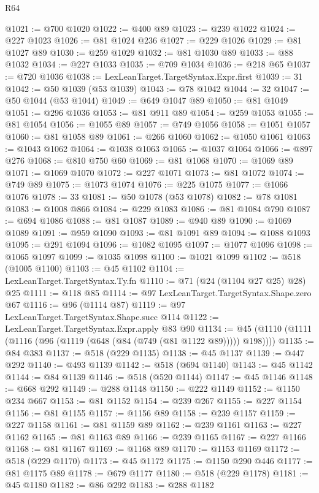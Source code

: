 \begin{lexlean}{R64}
\begin{coremodule}
@1021 := @700 @1020
@1022 := @400 @89
@1023 := @239 @1022
@1024 := @227 @1023
@1026 := @81 @1024 @236
@1027 := @229 @1026
@1029 := @81 @1027 @89
@1030 := @259 @1029
@1032 := @81 @1030 @89
@1033 := @88 @1032
@1034 := @227 @1033
@1035 := @709 @1034
@1036 := @218 @65
@1037 := @720 @1036
@1038 := LexLeanTarget.TargetSyntax.Expr.first
@1039 := 31
@1042 := @50 @1039 (@53 @1039)
@1043 := @78 @1042
@1044 := 32
@1047 := @50 @1044 (@53 @1044)
@1049 := @649 @1047 @89
@1050 := @81 @1049
@1051 := @296 @1036
@1053 := @81 @911 @89
@1054 := @259 @1053
@1055 := @81 @1054
@1056 := @1055 @89
@1057 := @749 @1056
@1058 := @1051 @1057
@1060 := @81 @1058 @89
@1061 := @266 @1060
@1062 := @1050 @1061
@1063 := @1043 @1062
@1064 := @1038 @1063
@1065 := @1037 @1064
@1066 := @897 @276
@1068 := @810 @750 @60
@1069 := @81 @1068
@1070 := @1069 @89
@1071 := @1069 @1070
@1072 := @227 @1071
@1073 := @81 @1072
@1074 := @749 @89
@1075 := @1073 @1074
@1076 := @225 @1075
@1077 := @1066 @1076
@1078 := 33
@1081 := @50 @1078 (@53 @1078)
@1082 := @78 @1081
@1083 := @1008 @866
@1084 := @229 @1083
@1086 := @81 @1084 @790
@1087 := @694 @1086
@1088 := @81 @1087
@1089 := @940 @89
@1090 := @1069 @1089
@1091 := @959 @1090
@1093 := @81 @1091 @89
@1094 := @1088 @1093
@1095 := @291 @1094
@1096 := @1082 @1095
@1097 := @1077 @1096
@1098 := @1065 @1097
@1099 := @1035 @1098
@1100 := @1021 @1099
@1102 := @518 (@1005 @1100)
@1103 := @45 @1102
@1104 := LexLeanTarget.TargetSyntax.Ty.fn
@1110 := @71 (@24 (@1104 @27 @25) @28) @25
@1111 := @118 @85
@1114 := @97 LexLeanTarget.TargetSyntax.Shape.zero @67
@1116 := @96 (@1114 @87)
@1119 := @97 LexLeanTarget.TargetSyntax.Shape.succ @114
@1122 := LexLeanTarget.TargetSyntax.Expr.apply @83 @90
@1134 := @45 (@1110 (@1111 (@1116 (@96 (@1119 (@648 (@84 (@749 (@81 @1122 @89))))) @198))))
@1135 := @84 @383
@1137 := @518 (@229 @1135)
@1138 := @45 @1137
@1139 := @447 @292
@1140 := @493 @1139
@1142 := @518 (@694 @1140)
@1143 := @45 @1142
@1144 := @84 @1139
@1146 := @518 (@520 @1144)
@1147 := @45 @1146
@1148 := @668 @292
@1149 := @288 @1148
@1150 := @222 @1149
@1152 := @1150 @234 @667
@1153 := @81 @1152
@1154 := @239 @267
@1155 := @227 @1154
@1156 := @81 @1155
@1157 := @1156 @89
@1158 := @239 @1157
@1159 := @227 @1158
@1161 := @81 @1159 @89
@1162 := @239 @1161
@1163 := @227 @1162
@1165 := @81 @1163 @89
@1166 := @239 @1165
@1167 := @227 @1166
@1168 := @81 @1167
@1169 := @1168 @89
@1170 := @1153 @1169
@1172 := @518 (@229 @1170)
@1173 := @45 @1172
@1175 := @1150 @290 @446
@1177 := @81 @1175 @89
@1178 := @679 @1177
@1180 := @518 (@229 @1178)
@1181 := @45 @1180
@1182 := @86 @292
@1183 := @288 @1182

\end{coremodule}
\end{lexlean}
